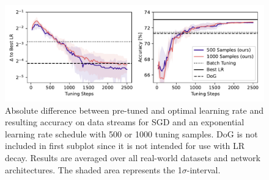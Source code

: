 \documentclass{article} %
\begin{document}
\begin{figure}[!ht]
   \centering
   \includegraphics[width=\textwidth]{figures/pretune_all_acc_lr_exp_schedule.pdf}
   \caption{Absolute difference between pre-tuned and optimal learning rate and resulting accuracy on data streams for SGD and an exponential learning rate schedule with 500 or 1000 tuning samples. DoG is not included in first subplot since it is not intended for use with LR decay. Results are averaged over all real-world datasets and network architectures. The shaded area represents the 1$\sigma$-interval.}\label{fig:pretune_lr_accuracy}
\end{figure}
\end{document}
